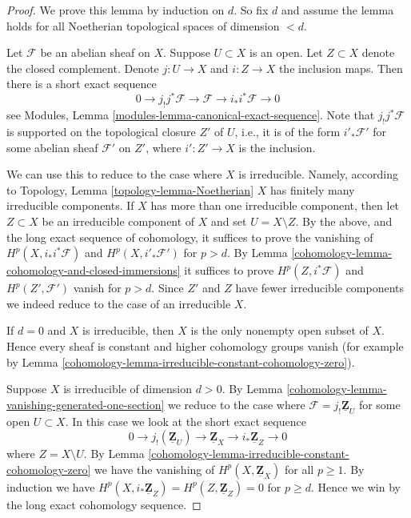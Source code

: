 \begin{proof}

We prove this lemma by induction on $d$.
So fix $d$ and assume the lemma holds for all
Noetherian topological spaces of dimension $< d$.

\medskip\noindent
Let $\mathcal{F}$ be an abelian sheaf on $X$.
Suppose $U \subset X$ is an open. Let $Z \subset X$
denote the closed complement.
Denote $j : U \to X$ and $i : Z \to X$ the inclusion maps.
Then there is a short exact sequence
$$
0 \to j_{!}j^*\mathcal{F} \to \mathcal{F} \to i_*i^*\mathcal{F} \to 0
$$
see Modules, Lemma \ref{modules-lemma-canonical-exact-sequence}.
Note that $j_!j^*\mathcal{F}$ is supported on
the topological closure $Z'$ of $U$, i.e., it is of
the form $i'_*\mathcal{F}'$ for some abelian sheaf $\mathcal{F}'$
on $Z'$, where $i' : Z' \to X$ is the inclusion.

\medskip\noindent
We can use this to reduce to the case where $X$ is irreducible.
Namely, according to
Topology, Lemma \ref{topology-lemma-Noetherian}
$X$ has finitely
many irreducible components. If $X$ has more than one irreducible
component, then let $Z \subset X$ be an irreducible component of $X$
and set $U = X \setminus Z$. By the above, and the long exact sequence
of cohomology, it suffices to prove the vanishing of
$H^p(X, i_*i^*\mathcal{F})$ and $H^p(X, i'_*\mathcal{F}')$ for $p > d$.
By Lemma \ref{cohomology-lemma-cohomology-and-closed-immersions} it suffices to prove
$H^p(Z, i^*\mathcal{F})$ and $H^p(Z', \mathcal{F}')$ vanish for $p > d$.
Since $Z'$ and $Z$ have fewer irreducible components we indeed
reduce to the case of an irreducible $X$.

\medskip\noindent
If $d = 0$ and $X$ is irreducible, then $X$ is the only nonempty
open subset of $X$. Hence every sheaf is constant and higher cohomology
groups vanish (for example by
Lemma \ref{cohomology-lemma-irreducible-constant-cohomology-zero}).

\medskip\noindent
Suppose $X$ is irreducible of dimension $d > 0$.
By Lemma \ref{cohomology-lemma-vanishing-generated-one-section}
we reduce to the case where
$\mathcal{F} = j_!\underline{\mathbf{Z}}_U$ for some open $U \subset X$.
In this case we look at the short exact sequence
$$
0 \to j_!(\underline{\mathbf{Z}}_U) \to
\underline{\mathbf{Z}}_X \to i_*\underline{\mathbf{Z}}_Z \to 0
$$
where $Z = X \setminus U$.
By Lemma \ref{cohomology-lemma-irreducible-constant-cohomology-zero}
we have the vanishing of $H^p(X, \underline{\mathbf{Z}}_X)$
for all $p \geq 1$. By induction we have
$H^p(X, i_*\underline{\mathbf{Z}}_Z) = H^p(Z, \underline{\mathbf{Z}}_Z) = 0$
for $p \geq d$. Hence we win by the long exact cohomology sequence.
\end{proof}

